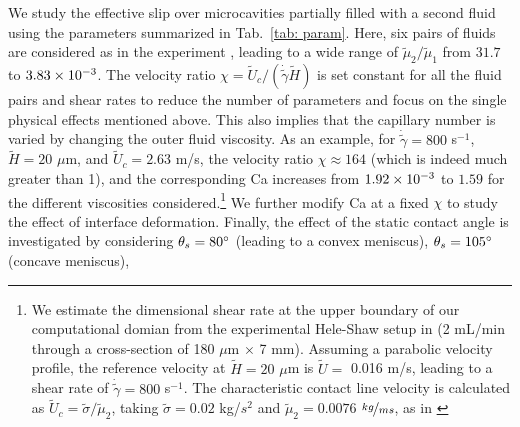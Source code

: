 We study the effective slip over microcavities partially filled with a second fluid using the parameters summarized in Tab.\ \ref{tab: param}.
Here, six pairs of fluids are considered as in the experiment \citep{Solomon}, leading to a wide range of $\tilde{\mu}_2/\tilde{\mu}_1$ from $31.7$ to $3.83\times 10^{-3}$.  The velocity ratio $\chi=\tilde{U}_c/ (\dot{\tilde{\gamma}} \tilde{H})$ is set constant for all the fluid pairs and shear rates to reduce the number of parameters and focus on the single physical effects mentioned above. This also implies that the capillary number is varied by changing the outer fluid viscosity. As an example, for $\dot{\tilde{\gamma}}=800$ s$^{-1}$, $\tilde{H}=20$ $\mu$m, and $\tilde{U}_c=2.63$ m/s, 
the velocity ratio $\chi \approx 164$ (which is indeed much greater than 1), and the corresponding Ca increases from $1.92\times 10^{-3}$ to $1.59$ for the different viscosities considered.\footnote{We estimate the dimensional shear rate at the upper boundary of our computational domian from the experimental Hele-Shaw setup in \cite{Wexler} (2 mL/min through a cross-section of 180 $\mu$m $\times$ 7 mm). Assuming a parabolic velocity profile, the reference velocity at $\tilde{H}=20$ $\mu$m is $\tilde{U}=$ 0.016 m/s, leading to a shear rate of $\dot{\tilde{\gamma}}=800$ s$^{-1}$. The characteristic contact line velocity is calculated as $\tilde{U}_c=\tilde{\sigma}/\tilde{\mu}_2$, taking $\tilde{\sigma}=0.02$ kg/$s^2$ and $\tilde{\mu}_2=0.0076$ $\nicefrac{kg}{ms}$, as in \cite{Martin}} We further modify Ca at a fixed $\chi$ to study the effect of interface deformation. Finally, the effect of the static contact angle is investigated by considering $\theta_s=80\degree$ (leading to a convex meniscus), $\theta_s=105\degree$ (concave meniscus), 

